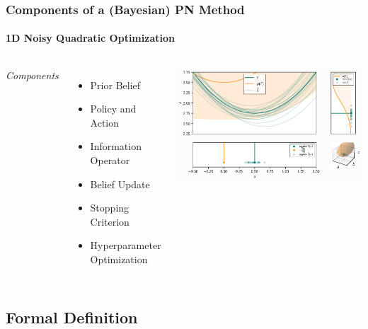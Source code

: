 \documentclass[10pt,usepdftitle=false,aspectratio=169]{beamer}
\begin{document}
\begin{frame}\frametitle{Components of a (Bayesian) PN Method}
	\framesubtitle{1D Noisy Quadratic Optimization}

	\begin{columns}[c,totalwidth=\textwidth]

		\emph{Components}
		\begin{itemize}
			\item Prior Belief
			\item Policy and Action
			\item Information Operator
			\item Belief Update
			\item Stopping Criterion
			\item Hyperparameter Optimization

		\end{itemize}

		\centering
		\href{https://probnum.readthedocs.io/en/latest/tutorials/pn_methods.html}{\includegraphics[width=\textwidth]{figures/quadratic-optimization.png}}

	\end{columns}

\end{frame}

\subsection{Formal Definition}
\end{document}

